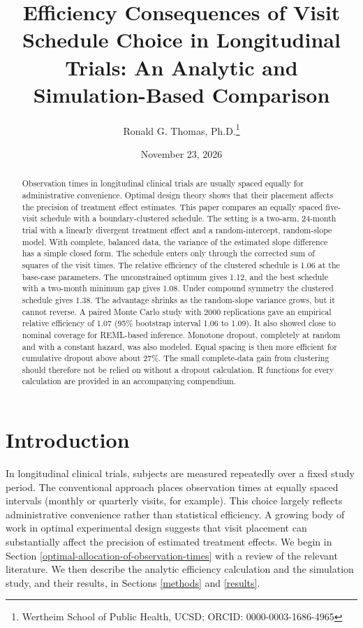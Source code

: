 \documentclass[
  11pt,
]{article}
\title{Efficiency Consequences of Visit Schedule Choice in Longitudinal Trials: An Analytic and Simulation-Based Comparison}
\author{Ronald G. Thomas, Ph.D.\thanks{Wertheim School of Public Health, UCSD; ORCID: 0000-0003-1686-4965}}
\date{November 23, 2026}
\begin{document}
\maketitle
\begin{abstract}
Observation times in longitudinal clinical trials are usually
spaced equally for administrative convenience. Optimal design
theory shows that their placement affects the precision of
treatment effect estimates. This paper compares an equally spaced
five-visit schedule with a boundary-clustered schedule. The
setting is a two-arm, 24-month trial with a linearly divergent
treatment effect and a random-intercept, random-slope model. With
complete, balanced data, the variance of the estimated slope
difference has a simple closed form. The schedule enters only
through the corrected sum of squares of the visit times. The
relative efficiency of the clustered schedule is 1.06 at the
base-case parameters. The unconstrained optimum gives 1.12, and
the best schedule with a two-month minimum gap gives 1.08. Under
compound symmetry the clustered schedule gives 1.38. The advantage
shrinks as the random-slope variance grows, but it cannot reverse.
A paired Monte Carlo study with 2000 replications gave an
empirical relative efficiency of 1.07 (95\% bootstrap interval
1.06 to 1.09). It also showed close to nominal coverage for
REML-based inference. Monotone dropout, completely at random and
with a constant hazard, was also modeled. Equal spacing is then
more efficient for cumulative dropout above about 27\%. The small
complete-data gain from clustering should therefore not be relied
on without a dropout calculation. R functions for every
calculation are provided in an accompanying compendium.
\end{abstract}

{
\setcounter{tocdepth}{2}
\tableofcontents
}
\section{Introduction}\label{introduction}

In longitudinal clinical trials, subjects are measured
repeatedly over a fixed study period. The conventional approach
places observation times at equally spaced intervals (monthly or
quarterly visits, for example). This choice largely reflects
administrative convenience rather than statistical efficiency. A
growing body of work in optimal experimental design suggests that
visit placement can substantially affect the precision of
estimated treatment effects. We begin in Section
\ref{optimal-allocation-of-observation-times} with a review of
the relevant literature. We then describe the analytic efficiency
calculation and the simulation study, and their results, in
Sections \ref{methods} and \ref{results}.
\end{document}
